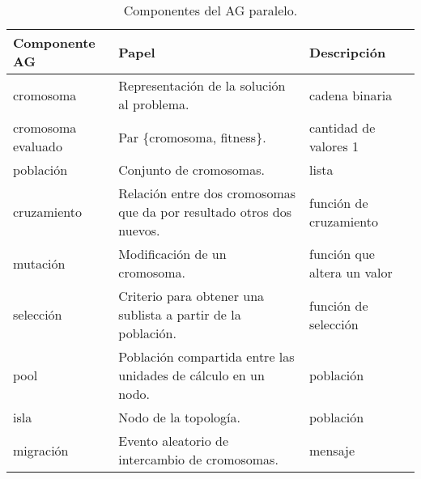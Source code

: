 \begin{table}
  \centering
  \caption{Componentes del AG paralelo.}\label{agpComp}
   \begin{tabular}{|p{3cm}|p{5cm}|p{3cm}|}
   \hline
   \textbf{Componente AG} & \textbf{Papel} & \textbf{Descripción}\\
     \hline
      cromosoma & Representación de la solución al problema. & cadena binaria \\
     \hline
      cromosoma evaluado & Par \{cromosoma, fitness\}. & cantidad de valores 1\\
     \hline
      población & Conjunto de cromosomas. & lista\\
     \hline
     cruzamiento & Relación entre dos cromosomas que da por resultado otros dos nuevos. & función de cruzamiento\\
     \hline
      mutación & Modificación de un cromosoma.& función que altera un valor\\
     \hline
     selección & Criterio para obtener una sublista a partir de la población. & función de selección\\
     \hline
      pool & Población compartida entre las unidades de cálculo en un nodo. & población\\
     \hline
      isla & Nodo de la topología. & población\\
     \hline
      migración & Evento aleatorio de intercambio de cromosomas. & mensaje\\
     \hline
   \end{tabular}

\end{table}
